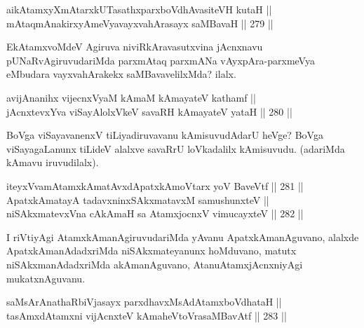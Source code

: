 
\begin{shl}
aikAtamxyXmAtarxkUTasathxparxboVdhAvasiteVH kutaH || \\
mAtaqmAnakirxyAmeVyavayxvahArasayx saMBavaH \hfill || 279 ||  
\end{shl}

\begin{artha}
EkAtamxvoMdeV Agiruva niviRkAravasutxvina jAcnxnavu
pUNaRvAgiruvudariMda parxmAtaq parxmANa vAyxpAra-parxmeVya eMbudara
vayxvahArakekx saMBavavelilxMda? ilalx.
\end{artha}


\begin{shl}
avijAnanihx vijecnxVyaM kAmaM kAmayateV kathamf || \\
jAcnxtevxYva viSayAlolxVkeV savaRH kAmayateV yataH \hfill || 280 ||  
\end{shl}

\begin{artha}
BoVga viSayavanenxV tiLiyadiruvavanu kAmisuvudAdarU heVge? BoVga
viSayagaLanunx tiLideV alalxve savaRrU loVkadalilx kAmisuvudu.
(adariMda kAmavu iruvudilalx).
\end{artha}

\begin{shl}
iteyxVvamAtamxkAmatAvxdApatxkAmoV\s tarx yoV BaveVtf \hfill || 281 ||  \\
ApatxkAmatayA tadavxninxSAkxmatavxM samushunxteV || \\
niSAkxmatevxVna cAkAmaH sa AtamxjocnxV vimucayxteV \hfill || 282 ||  
\end{shl}

\begin{artha}
I riVtiyAgi AtamxkAmanAgiruvudariMda yAvanu ApatxkAma\-\break nAguvano, alalxde
ApatxkAmanAdadxriMda niSAkxmateyanunx hoMduvano, matutx
niSAkxmanAdadxriMda akAmanAguvano, Atanu\break AtamxjAcnxniyAgi
mukatxnAguvanu.
\end{artha}


\begin{shl}
saMsArAnathaRbiVjasayx parxdhavxMsAdAtamxboVdhataH || \\
tasAmxdAtamxni vijAcnxteV kAmaheVtoVrasaMBavAtf \hfill || 283 ||  
\end{shl}

